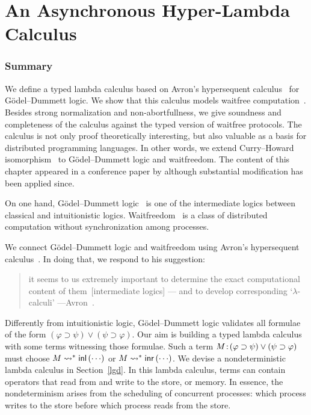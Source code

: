 \renewcommand{\comodL}{\comod cd}
\renewcommand{\comodR}{\comod dc}

\chapter{An Asynchronous Hyper-Lambda Calculus}
\label{ch:lambda}

\subsection{Summary}

We define a typed lambda calculus based on Avron's hypersequent
calculus~\citep{avron91} for G\"odel--Dummett logic.
We show that this calculus models
waitfree computation~\citep{Herlihy88,Saks:1993vq}.
Besides strong normalization and non-abortfullness,
we give soundness and completeness of
the calculus against the typed version of waitfree protocols.
The calculus is not only proof theoretically interesting,
but also valuable as a basis for distributed programming languages.
In other words, we extend
Curry--Howard isomorphism~\cite{curryhoward} to G\"odel--Dummett logic and
waitfreedom.
The content of this chapter appeared in a conference paper by
\citet{hiraiflops2012} although substantial modification has been
applied since.

On one hand, G\"odel--Dummett logic~\cite{dummett59}
is one of the intermediate logics
between classical and intuitionistic logics.
Waitfreedom~\cite{Herlihy88,Saks:1993vq} is a class of distributed
computation without synchronization among processes.

We connect G\"odel--Dummett logic and waitfreedom using
Avron's hypersequent calculus~\cite{avron91}.
In doing that, we respond to his suggestion:
\begin{quote}
it seems to us extremely important to determine the exact
       computational content of them~[intermediate logics] ---
       and {to develop corresponding `$\lambda$-calculi'}
       ---Avron~\cite{avron91}.
\end{quote}
Differently from intuitionistic logic, G\"odel--Dummett logic validates
all formulae of the form
 $(\varphi\supset\psi)\vee(\psi\supset\varphi)$.
Our aim is building a typed lambda calculus
with some terms witnessing those formulae.
Such a term
${M} \mathord{\colon\kern -2pt}{(\varphi\supset\psi)\vee(\psi\supset\varphi)}$ must choose
$M\rightsquigarrow^\ast \mathsf{inl}\left({\cdots}\right)$ or $M\rightsquigarrow^\ast \mathsf{inr}\left({\cdots}\right)$.
We devise a nondeterministic lambda calculus in Section~\ref{lgd}.
In this lambda calculus, terms can contain operators that read from and
write to the store, or memory.
In essence, the nondeterminism arises from the scheduling of concurrent
processes: which process writes to the store before which process
reads from the store.

